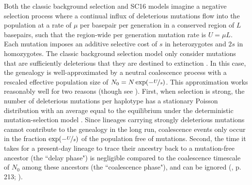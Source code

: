 \documentclass[11pt]{article}
\begin{document}
Both the classic background selection and SC16 models imagine a negative
selection process where a continual influx of deleterious mutations flow into
the population at a rate of $\mu$ per basepair per generation in a conserved
region of $L$ basepairs, such that the region-wide per generation mutation rate
is $U = \mu L$. Each mutation imposes an additive selective cost of $s$ in
heterozygotes and $2s$ in homozygotes. The classic background selection model
only consider mutations that are sufficiently deleterious that they are
destined to extinction
\parencite{Charlesworth1993-gb,Nordborg1996-nq,Hudson1995-pt,Hudson1994-oh}. In
this case, the genealogy is well-approximated by a neutral coalescence process
with a rescaled effective population size of $N_0 = N \exp(-\nicefrac{U}{s})$.
This approximation works reasonably well for two reasons (though see
\cite{Cvijovic2018-vd,Walczak2012-fi,Nicolaisen2012-vs}). First, when selection
is strong, the number of deleterious mutations per haplotype has a stationary
Poisson distribution with an average equal to the equilibrium under the
deterministic mutation-selection model \parencite{Haldane1927-ga}. Since
lineages carrying strongly deleterious mutations cannot contribute to the
genealogy in the long run, coalescence events only occur in the fraction
$\exp(-\nicefrac{U}{s})$ of the population free of mutations. Second, the time
it takes for a present-day lineage to trace their ancestry back to a
mutation-free ancestor (the ``delay phase") is negligible compared to the
coalescence timescale of $N_0$ among these ancestors (the ``coalescence
phase"), and can be ignored (\cite{Durrett2008-ql}, p. 213;
\cite{Good2014-yz}).
\end{document}
